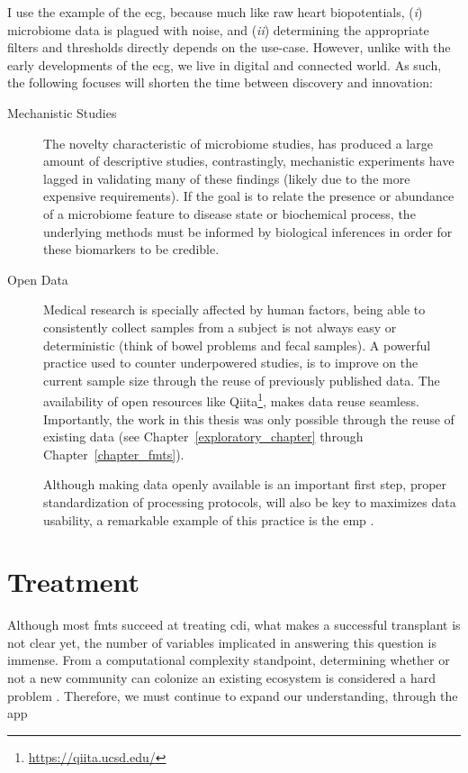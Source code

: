I use the example of the \gls{ecg}, because much like raw heart biopotentials,
(\textit{i}) microbiome data is plagued with noise, and (\textit{ii})
determining the appropriate filters and thresholds directly depends on the
use-case. However, unlike with the early developments of the \gls{ecg}, we live
in digital and connected world. As such, the following focuses will
shorten the time between discovery and innovation:

\begin{description}

  \item[Mechanistic Studies]The novelty characteristic of microbiome studies,
  has produced a large amount of descriptive studies, contrastingly,
  mechanistic experiments have lagged in validating many of these findings 
  (likely due to the more expensive requirements).  If the goal is to relate 
  the presence or abundance of a microbiome feature to disease state or 
  biochemical process, the underlying methods must be informed
  by biological inferences in order for these biomarkers to be credible.

  \item[Open Data]Medical research is specially affected by human factors,
  being able to consistently collect samples from a subject is not always easy
  or deterministic (think of bowel problems and fecal samples). A powerful
  practice used to counter underpowered studies, is to improve on the current
  sample size through the reuse of previously published data. The availability
  of open resources like Qiita\footnote{\url{https://qiita.ucsd.edu/}}, makes
  data reuse seamless. Importantly, the work in this thesis was only possible
  through the reuse of existing data (see Chapter~\ref{exploratory_chapter}
  through Chapter~\ref{chapter_fmts}).

  Although making data openly available is an important first step, proper
  standardization of processing protocols, will also be key to maximizes data 
  usability, a remarkable example of this practice is the \gls{emp} 
  \cite{RN4267}.

\end{description}

\section{Treatment}

Although most \glspl{fmt} succeed at treating \gls{cdi}, what makes a
successful transplant is not clear yet, the number of variables implicated in
answering this question is immense. From a computational complexity standpoint,
determining whether or not a new community can colonize an existing ecosystem
is considered a hard problem \cite{RN4266}. Therefore, we must continue to
expand our understanding, through the app

